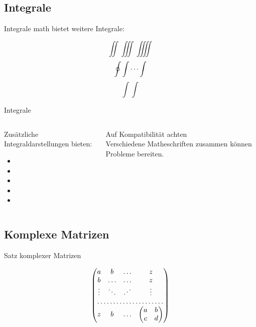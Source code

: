\documentclass[
	vorläufig=false,
	datum=2022-11-02,
	titel={Mathematiksatz II},
	web=true,
	max,
	aspectratio=1610,
]{../tex/latexkurs-slides}
\begin{document}
\subsection{Integrale}
\begin{frame}[fragile]{Integrale}
\AmS{}math bietet weitere Integrale:
\begin{LTXexample}[width=.45\textwidth]
\[ \iint \iiint \iiiint \]
\[ \oint \idotsint \]
\[ \int \int \]
\end{LTXexample}
\end{frame}

\begin{frame}[fragile]{Integrale}
\begin{columns}
\begin{column}{.4\textwidth}
Zusätzliche Integraldarstellungen bieten:
\begin{itemize}
\item {}
\item {}
\item {}
\item {}
\item {}
\end{itemize}
\end{column}
\begin{column}{.5\textwidth}
\alert{Auf Kompatibilität achten}\\
Verschiedene Matheschriften zusammen können Probleme bereiten.
\end{column}
\end{columns}
\end{frame}


\subsection{Komplexe Matrizen}
\begin{frame}[fragile]{Satz komplexer Matrizen}
\begin{LTXexample}[width=.4\textwidth]
\[
\begin{pmatrix}
  a & b     & \dots & z\\
  b & \dots & \dots & z\\
  \vdots & \ddots& \reflectbox{\(\ddots\)} 
                              & \vdots\\
  \hdotsfor{4}\\
  z & b & \dots &
      \begin{pmatrix}
        a & b \\ c & d
      \end{pmatrix}
\end{pmatrix}
\]

\end{LTXexample}
\end{frame}
\end{document}

